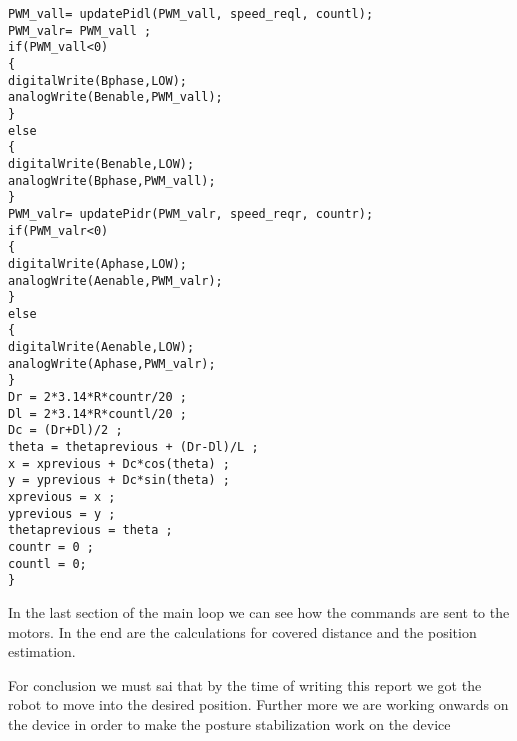 \begin{lstlisting}
PWM_vall= updatePidl(PWM_vall, speed_reql, countl);
PWM_valr= PWM_vall ;
if(PWM_vall<0)
{
digitalWrite(Bphase,LOW);
analogWrite(Benable,PWM_vall);
}
else
{
digitalWrite(Benable,LOW);
analogWrite(Bphase,PWM_vall);
}
PWM_valr= updatePidr(PWM_valr, speed_reqr, countr);
if(PWM_valr<0)
{
digitalWrite(Aphase,LOW);
analogWrite(Aenable,PWM_valr);
}
else
{
digitalWrite(Aenable,LOW);
analogWrite(Aphase,PWM_valr);
}
Dr = 2*3.14*R*countr/20 ;
Dl = 2*3.14*R*countl/20 ;
Dc = (Dr+Dl)/2 ;
theta = thetaprevious + (Dr-Dl)/L ;
x = xprevious + Dc*cos(theta) ;
y = yprevious + Dc*sin(theta) ;
xprevious = x ;
yprevious = y ;
thetaprevious = theta ;
countr = 0 ;
countl = 0;
}
\end{lstlisting}

In the last section of the main loop we can see how the commands are sent to the motors. In the end are the calculations for covered distance and the position estimation.

For conclusion we must sai that by the time of writing this report we got the robot to move into the desired position. Further more we are working onwards on the device in order to make the posture stabilization work on the device